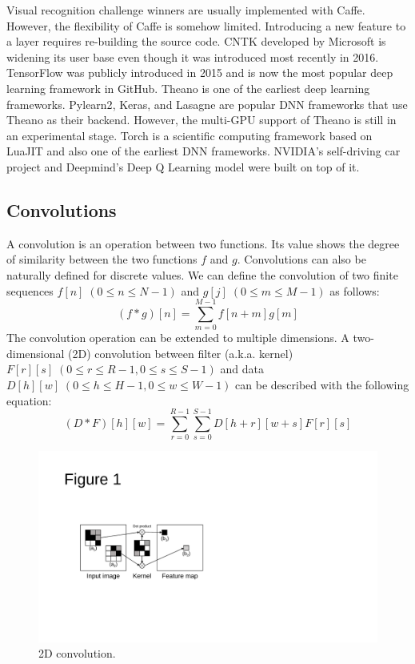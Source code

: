 Visual recognition challenge winners are usually implemented with Caffe\cite{ILSVRC15, RCNN, vgg}. However, the flexibility of Caffe is somehow limited. Introducing a new feature to a layer requires re-building the source code. CNTK developed by Microsoft is widening its user base even though it was introduced most recently in 2016. TensorFlow was publicly introduced in 2015 and is now the most popular deep learning framework in GitHub\cite{github}. Theano is one of the earliest deep learning frameworks. Pylearn2\cite{pylearn2}, Keras\cite{keras}, and Lasagne\cite{lasagne} are popular DNN frameworks that use Theano as their backend. However, the multi-GPU support of Theano is still in an experimental stage. Torch is a scientific computing framework based on LuaJIT\cite{torch} and also one of the earliest DNN frameworks. NVIDIA's self-driving car project\cite{nvdave} and Deepmind's Deep Q Learning model\cite{mnih2015humanlevel} were built on top of it.

\subsection{Convolutions}
A convolution is an operation between two functions. Its value shows the degree of similarity between the two functions $f$ and $g$. Convolutions can also be naturally defined for discrete values. We can define the convolution of two finite sequences $f[n] \; (0 \leq n \leq N-1)$ and $g[j] \; (0 \leq m \leq M-1)$ as follows:
\begin{equation}
\label{def_discrete}
\left ( f * g \right )[n] = \sum_{m=0}^{M-1} f[n + m]g[m]
\end{equation}
The convolution operation can be extended to multiple dimensions. A two-dimensional (2D) convolution between filter (a.k.a. kernel) $F[r][s] \; (0 \leq r \leq R-1, 0 \leq s \leq S-1)$ and data $D[h][w] \; (0 \leq h \leq H-1, 0 \leq w \leq W-1)$ can be described with the following equation:
\begin{equation}
\label{def_2d}
\left ( D * F \right )[h][w] = \sum_{r=0}^{R-1}\sum_{s=0}^{S-1} D[h + r][w + s] F[r][s]
\label{2d-conv}
\end{equation}

\begin{figure}[htbp]
  \centering
  \includegraphics[width=0.6\linewidth]{./figures/feature-map}
  \caption{2D convolution. }
  \label{fig_conv}
\end{figure}

